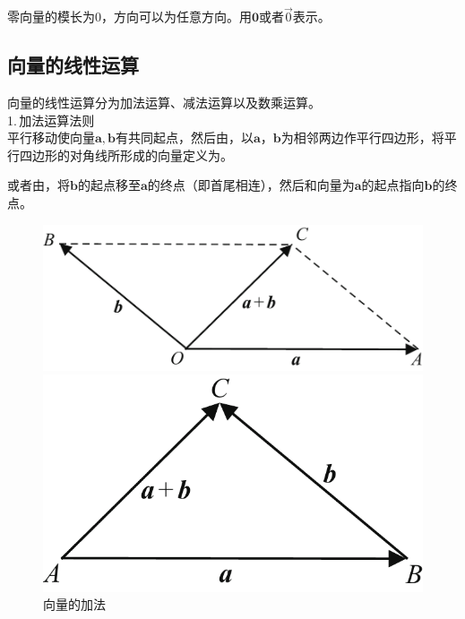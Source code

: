 \vspace*{-1em}
零向量的模长为0，方向可以为任意方向。用$\boldsymbol{0}$或者$\vec{0}$表示。
\subsection{向量的线性运算}
向量的线性运算分为加法运算、减法运算以及数乘运算。
\\ 1.$\,$加法运算法则\\

\vspace*{-1em}\vspace*{-1em}
平行移动使向量$\boldsymbol{a},\boldsymbol{b}$有共同起点，然后由，以$\boldsymbol{a}，\boldsymbol{b}$为相邻两边作平行四边形，将平行四边形的对角线所形成的向量定义为。
\par 或者由，将$\boldsymbol{b}$的起点移至$\boldsymbol{a}$的终点（即首尾相连），然后和向量为$\boldsymbol{a}$的起点指向$\boldsymbol{b}$的终点。
\begin{figure}[h]
\begin{minipage}{0.5\linewidth}
	\centering
	\includegraphics[width = 0.81\linewidth]{pic/C-5/vecadd}
\end{minipage}
\begin{minipage}{0.5\linewidth}
	\centering
	\includegraphics[width = 0.57\linewidth]{pic/C-5/vecadd2}
\end{minipage}
\caption{向量的加法}
\label{向量的加法}
\end{figure}

